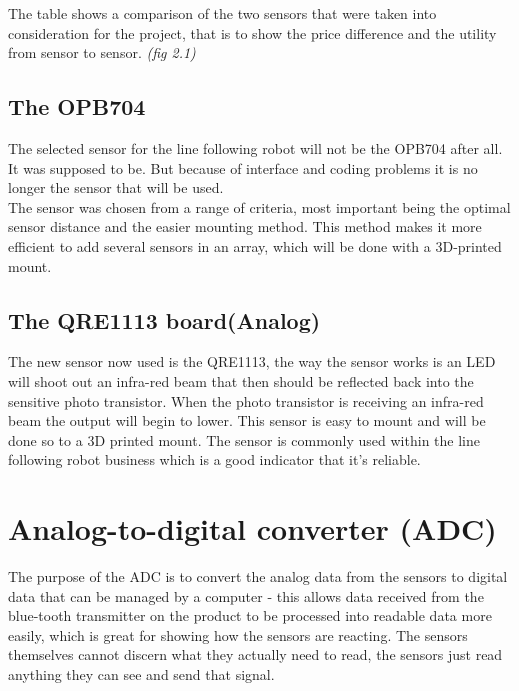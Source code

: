 The table shows a comparison of the two sensors that were taken into consideration for the project, that is to show the price difference and the utility from sensor to sensor. \emph{(fig 2.1)}



\subsection{The OPB704
}
The selected sensor for the line following robot will not be the OPB704 after all. It was supposed to be. But because of interface and coding problems it is no longer the sensor that will be used.\\
The sensor was chosen from a range of criteria, most important being the optimal sensor distance and the easier mounting method. This method makes it more efficient to add several sensors in an array, which will be done with a 3D-printed mount. 


\subsection{The QRE1113 board(Analog)}

The new sensor now used is the QRE1113, the way the sensor works is an LED will shoot out an infra-red beam that then should be reflected back into the sensitive photo transistor. When the photo transistor is receiving an infra-red beam the output will begin to lower. This sensor is easy to mount and will be done so to a 3D printed mount. The sensor is commonly used within the line following robot business which is a good indicator that it's reliable.



\section{Analog-to-digital converter (ADC)}

The purpose of the ADC is to convert the analog data from the sensors to digital data that can be managed by a computer - this allows data received from the blue-tooth transmitter on the product to be processed into readable data more easily, which is great for showing how the sensors are reacting. The sensors themselves cannot discern what they actually need to read, the sensors just read anything they can see and send that signal.

